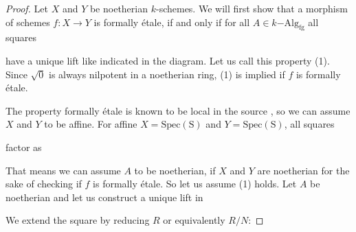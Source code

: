\documentclass[9pt,twosided]{amsart}
\newcommand{\fgkAlg}{\ensuremath{k\mathrm{-Alg}_{\mathrm{fg}}}}
\begin{document}
\begin{proof}
  Let $X$ and $Y$ be noetherian $k$-schemes. 
  We will first show that a morphism of schemes $f:X\to Y$ is formally étale,
  if and only if for all $A\in\fgkAlg$ all squares
  \begin{center}
  \end{center}
  have a unique lift like indicated in the diagram. Let us call this property (1).
  Since $\sqrt{0}$ is always nilpotent in a noetherian ring, (1) is implied if $f$ is formally étale.
  
  The property formally étale is known to be local in the source \cite[§ 17.1.6]{GrothendieckDieudonne}, so we can assume $X$ and $Y$ to be affine.
  For affine $X=\mathrm{Spec(S)}$ and $Y=\mathrm{Spec(S)}$, all squares
  \begin{center}
  \end{center}
  factor as 
  \begin{center}
  \end{center}
  That means we can assume $A$ to be noetherian, if $X$ and $Y$ are noetherian for the sake of checking if $f$ is formally étale.
  So let us assume (1) holds. Let $A$ be noetherian and let us construct a unique lift in
  \begin{center}
  \end{center}
  We extend the square by reducing $R$ or equivalently $R/N$:

\end{proof}
\end{document}
